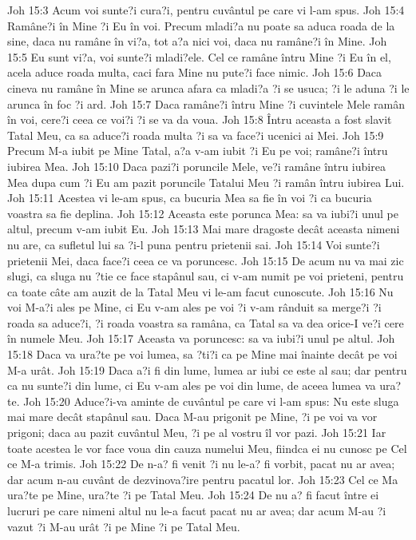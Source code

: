 Joh 15:3  Acum voi sunte?i cura?i, pentru cuvântul pe care vi l-am spus.
Joh 15:4  Ramâne?i în Mine ?i Eu în voi. Precum mladi?a nu poate sa aduca roada de la sine, daca nu ramâne în vi?a, tot a?a nici voi, daca nu ramâne?i în Mine.
Joh 15:5  Eu sunt vi?a, voi sunte?i mladi?ele. Cel ce ramâne întru Mine ?i Eu în el, acela aduce roada multa, caci fara Mine nu pute?i face nimic.
Joh 15:6  Daca cineva nu ramâne în Mine se arunca afara ca mladi?a ?i se usuca; ?i le aduna ?i le arunca în foc ?i ard.
Joh 15:7  Daca ramâne?i întru Mine ?i cuvintele Mele ramân în voi, cere?i ceea ce voi?i ?i se va da voua.
Joh 15:8  Întru aceasta a fost slavit Tatal Meu, ca sa aduce?i roada multa ?i sa va face?i ucenici ai Mei.
Joh 15:9  Precum M-a iubit pe Mine Tatal, a?a v-am iubit ?i Eu pe voi; ramâne?i întru iubirea Mea.
Joh 15:10  Daca pazi?i poruncile Mele, ve?i ramâne întru iubirea Mea dupa cum ?i Eu am pazit poruncile Tatalui Meu ?i ramân întru iubirea Lui.
Joh 15:11  Acestea vi le-am spus, ca bucuria Mea sa fie în voi ?i ca bucuria voastra sa fie deplina.
Joh 15:12  Aceasta este porunca Mea: sa va iubi?i unul pe altul, precum v-am iubit Eu.
Joh 15:13  Mai mare dragoste decât aceasta nimeni nu are, ca sufletul lui sa ?i-l puna pentru prietenii sai.
Joh 15:14  Voi sunte?i prietenii Mei, daca face?i ceea ce va poruncesc.
Joh 15:15  De acum nu va mai zic slugi, ca sluga nu ?tie ce face stapânul sau, ci v-am numit pe voi prieteni, pentru ca toate câte am auzit de la Tatal Meu vi le-am facut cunoscute.
Joh 15:16  Nu voi M-a?i ales pe Mine, ci Eu v-am ales pe voi ?i v-am rânduit sa merge?i ?i roada sa aduce?i, ?i roada voastra sa ramâna, ca Tatal sa va dea orice-I ve?i cere în numele Meu.
Joh 15:17  Aceasta va poruncesc: sa va iubi?i unul pe altul.
Joh 15:18  Daca va ura?te pe voi lumea, sa ?ti?i ca pe Mine mai înainte decât pe voi M-a urât.
Joh 15:19  Daca a?i fi din lume, lumea ar iubi ce este al sau; dar pentru ca nu sunte?i din lume, ci Eu v-am ales pe voi din lume, de aceea lumea va ura?te.
Joh 15:20  Aduce?i-va aminte de cuvântul pe care vi l-am spus: Nu este sluga mai mare decât stapânul sau. Daca M-au prigonit pe Mine, ?i pe voi va vor prigoni; daca au pazit cuvântul Meu, ?i pe al vostru îl vor pazi.
Joh 15:21  Iar toate acestea le vor face voua din cauza numelui Meu, fiindca ei nu cunosc pe Cel ce M-a trimis.
Joh 15:22  De n-a? fi venit ?i nu le-a? fi vorbit, pacat nu ar avea; dar acum n-au cuvânt de dezvinova?ire pentru pacatul lor.
Joh 15:23  Cel ce Ma ura?te pe Mine, ura?te ?i pe Tatal Meu.
Joh 15:24  De nu a? fi facut între ei lucruri pe care nimeni altul nu le-a facut pacat nu ar avea; dar acum M-au ?i vazut ?i M-au urât ?i pe Mine ?i pe Tatal Meu.
